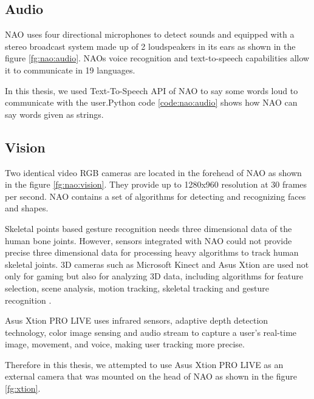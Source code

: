 \label{code:nao:motion}

\subsection{Audio} NAO uses four directional microphones to detect sounds and equipped with a stereo broadcast system made up of 2 loudspeakers in its ears as shown in the figure \ref{fg:nao:audio}. NAOs voice recognition and text-to-speech capabilities allow it to communicate in 19 languages. 

 

In this thesis, we used Text-To-Speech API of NAO to say some words loud to communicate with the user.Python code \ref{code:nao:audio} shows how NAO can say words given as strings.

 \label{code:nao:audio}

\subsection{Vision} Two identical video RGB cameras are located in the forehead of NAO as shown in the figure \ref{fg:nao:vision}. They provide up to 1280x960 resolution at 30 frames per second. NAO contains a set of algorithms for detecting and recognizing faces and shapes.



Skeletal points based gesture recognition needs three dimensional data of the human bone joints. However, sensors integrated with NAO could not provide precise three dimensional data for processing heavy algorithms to track human skeletal joints. 3D cameras such as Microsoft Kinect and Asus Xtion are used not only for gaming but also for analyzing 3D data, including algorithms for feature selection, scene analysis, motion tracking, skeletal tracking and gesture recognition \cite{12}. 

Asus Xtion PRO LIVE uses infrared sensors, adaptive depth detection technology, color image sensing and audio stream to capture a user's real-time image, movement, and voice, making user tracking more precise. 



Therefore in this thesis, we attempted to use Asus Xtion PRO LIVE as an external camera that was mounted on the head of NAO as shown in the figure \ref{fg:xtion}. 

